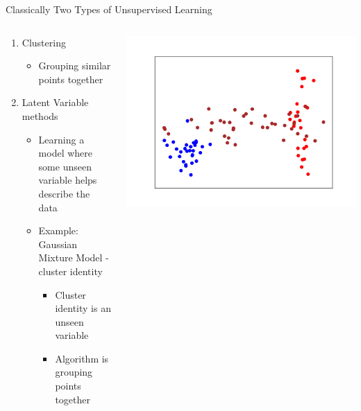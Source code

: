 \documentclass[aspectratio=169]{beamer}
\begin{document}
\begin{frame}{Classically Two Types of Unsupervised Learning}

\begin{columns}
\begin{column}{0.5\textwidth}
\begin{enumerate}
\item Clustering
	\begin{itemize}
	\item Grouping similar points together
	\end{itemize}
\item Latent Variable methods
	\begin{itemize}
		\item Learning a model where some unseen variable helps describe the data
		\item Example: Gaussian Mixture Model - cluster identity
		\begin{itemize}
			\item Cluster identity is an unseen variable
			\item Algorithm is grouping points together
		\end{itemize}
	\end{itemize}
\end{enumerate}
\end{column}
\begin{column}{0.5\textwidth}
   \includegraphics[width=1\textwidth]{lectUL/gaussianMixtureData.png} 
	\end{column}
\end{columns}


\end{frame}
\end{document}
